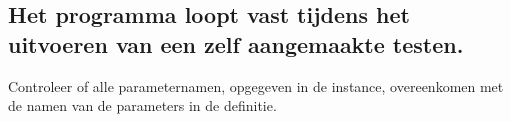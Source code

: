 \subsection{Het programma loopt vast tijdens het uitvoeren van een zelf aangemaakte testen.}
\npar 
Controleer of alle parameternamen, opgegeven in de instance, overeenkomen met de namen van de parameters in de definitie.